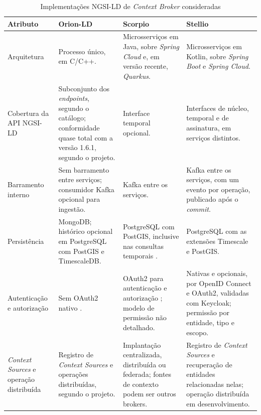 \begin{table}[!tp]
\centering
\caption{Implementações NGSI-LD de \textit{Context Broker} consideradas}
\label{tab:brokers}
\scriptsize
\begin{tabularx}{\textwidth}{@{}>{\raggedright\arraybackslash}p{2.5cm}>{\raggedright\arraybackslash}X>{\raggedright\arraybackslash}X>{\raggedright\arraybackslash}X@{}}
\toprule
\textbf{Atributo} & \textbf{Orion-LD} & \textbf{Scorpio} & \textbf{Stellio} \\
\midrule
Arquitetura & Processo único, em C/C++. & Microsserviços em Java, sobre \textit{Spring Cloud} e, em versão recente, \textit{Quarkus}. & Microsserviços em Kotlin, sobre \textit{Spring Boot} e \textit{Spring Cloud}. \\
\addlinespace
Cobertura da API NGSI-LD & Subconjunto dos \textit{endpoints}, segundo o catálogo; conformidade quase total com a versão 1.6.1, segundo o projeto. & Interface temporal opcional. & Interfaces de núcleo, temporal e de assinatura, em serviços distintos. \\
\addlinespace
Barramento interno & Sem barramento entre serviços; consumidor Kafka opcional para ingestão. & Kafka entre os serviços. & Kafka entre os serviços, com um evento por operação, publicado após o \textit{commit}. \\
\addlinespace
Persistência & MongoDB; histórico opcional em PostgreSQL com PostGIS e TimescaleDB. & PostgreSQL com PostGIS, inclusive nas consultas temporais \cite{ntallaris2024benchmarking}. & PostgreSQL com as extensões Timescale e PostGIS. \\
\addlinespace
Autenticação e autorização & Sem OAuth2 nativo \cite{lazidis2022publish}. & OAuth2 para autenticação e autorização \cite{lazidis2022publish,scorpio2026docs}; modelo de permissão não detalhado. & Nativas e opcionais, por OpenID Connect e OAuth2, validadas com Keycloak; permissão por entidade, tipo e escopo. \\
\addlinespace
\textit{Context Sources} e operação distribuída & Registro de \textit{Context Sources} e operações distribuídas, segundo o projeto. & Implantação centralizada, distribuída ou federada; fontes de contexto podem ser outros brokers. & Registro de \textit{Context Sources} e recuperação de entidades relacionadas nelas; operação distribuída em desenvolvimento. \\
\bottomrule
\end{tabularx}
\end{table}

